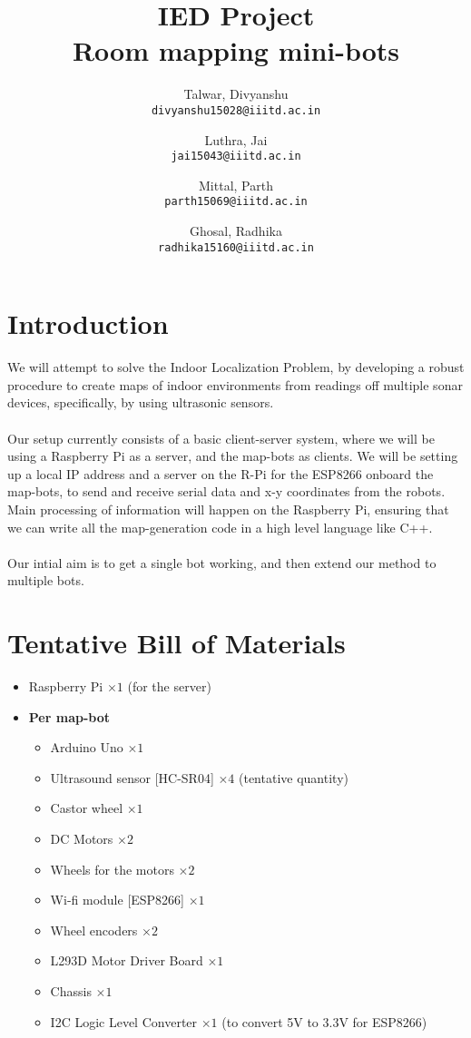\documentclass[12pt]{article}
\title{IED Project\\
        Room mapping mini-bots}
\author{
    Talwar, Divyanshu\\
    \texttt{divyanshu15028@iiitd.ac.in}
    \and
    Luthra, Jai\\
    \texttt{jai15043@iiitd.ac.in}
    \and
    Mittal, Parth\\
    \texttt{parth15069@iiitd.ac.in}
    \and
    Ghosal, Radhika\\
    \texttt{radhika15160@iiitd.ac.in}
}
\begin{document}
\maketitle
\tableofcontents

\pagebreak

\section{Introduction}

We will attempt to solve the Indoor Localization Problem, by developing a robust procedure to create maps of indoor environments from readings off multiple sonar devices, specifically, by using ultrasonic sensors.\\
\\
Our setup currently consists of a basic client-server system, where we will be using a Raspberry Pi as a server, and the map-bots as clients. 
We will be setting up a local IP address and a server on the R-Pi for the ESP8266 onboard the map-bots, to send and receive serial data and 
x-y coordinates from the robots. Main processing of information will happen on the Raspberry Pi, ensuring that we can write all the 
map-generation code in a high level language like C++.\\
\\
Our intial aim is to get a single bot working, and then extend our method to multiple bots.

\section{Tentative Bill of Materials}

\begin{itemize}
    \item
        Raspberry Pi $\times 1$ (for the server)
    \item
        \textbf{Per map-bot}
        \begin{itemize}
        \item
            Arduino Uno $\times 1$
        \item
            Ultrasound sensor [HC-SR04] $\times 4$ (tentative quantity)
        \item
            Castor wheel $\times 1$
        \item
            DC Motors $\times 2$
        \item
            Wheels for the motors $\times 2$
        \item
            Wi-fi module [ESP8266] $\times 1$
        \item
            Wheel encoders $\times 2$
        \item
            L293D Motor Driver Board $\times 1$
        \item
            Chassis $\times 1$
        \item
            I2C Logic Level Converter $\times 1$ (to convert 5V to 3.3V for ESP8266)
        \end{itemize}
\end{itemize}
\end{document}
